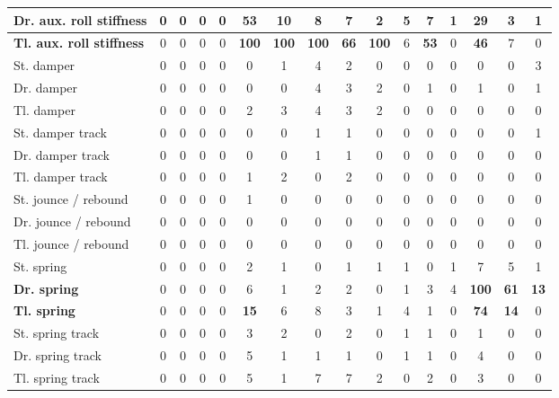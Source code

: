 \begin{table}[H]
\begin{tabular}{|l|c|c|c|c|c|c|c|c|c|c|c|c|c|c|c|}
    \hline
    \textcolor[rgb]{0.000, 0.447, 0.698}{\textbf{Dr. aux. roll stiffness}} & 0 & 0 & 0 & 0 & \textcolor[rgb]{0.000, 0.447, 0.698}{\textbf{53}} & \textbf{10} & 8 & 7 & 2 & 5 & 7 & 1 & \textcolor[rgb]{0.000, 0.620, 0.451}{\textbf{29}} & 3 & 1 \\
    \hline
    \textcolor[rgb]{0.851, 0.373, 0.008}{\textbf{Tl. aux. roll stiffness}} & 0 & 0 & 0 & 0 & \textcolor[rgb]{0.835, 0.369, 0.000}{\textbf{100}} & \textcolor[rgb]{0.835, 0.369, 0.000}{\textbf{100}} & \textcolor[rgb]{0.835, 0.369, 0.000}{\textbf{100}} & \textcolor[rgb]{0.000, 0.447, 0.698}{\textbf{66}} & \textcolor[rgb]{0.835, 0.369, 0.000}{\textbf{100}} & 6 & \textcolor[rgb]{0.000, 0.447, 0.698}{\textbf{53}} & 0 & \textcolor[rgb]{0.000, 0.620, 0.451}{\textbf{46}} & 7 & 0 \\
    \hline
    St. damper & 0 & 0 & 0 & 0 & 0 & 1 & 4 & 2 & 0 & 0 & 0 & 0 & 0 & 0 & 3 \\
    \hline
    Dr. damper & 0 & 0 & 0 & 0 & 0 & 0 & 4 & 3 & 2 & 0 & 1 & 0 & 1 & 0 & 1 \\
    \hline
    Tl. damper & 0 & 0 & 0 & 0 & 2 & 3 & 4 & 3 & 2 & 0 & 0 & 0 & 0 & 0 & 0 \\
    \hline
    St. damper track & 0 & 0 & 0 & 0 & 0 & 0 & 1 & 1 & 0 & 0 & 0 & 0 & 0 & 0 & 1 \\
    \hline
    Dr. damper track & 0 & 0 & 0 & 0 & 0 & 0 & 1 & 1 & 0 & 0 & 0 & 0 & 0 & 0 & 0 \\
    \hline
    Tl. damper track & 0 & 0 & 0 & 0 & 1 & 2 & 0 & 2 & 0 & 0 & 0 & 0 & 0 & 0 & 0 \\
    \hline
    St. jounce / rebound & 0 & 0 & 0 & 0 & 1 & 0 & 0 & 0 & 0 & 0 & 0 & 0 & 0 & 0 & 0 \\
    \hline
    Dr. jounce / rebound & 0 & 0 & 0 & 0 & 0 & 0 & 0 & 0 & 0 & 0 & 0 & 0 & 0 & 0 & 0 \\
    \hline
    Tl. jounce / rebound & 0 & 0 & 0 & 0 & 0 & 0 & 0 & 0 & 0 & 0 & 0 & 0 & 0 & 0 & 0 \\
    \hline
    St. spring & 0 & 0 & 0 & 0 & 2 & 1 & 0 & 1 & 1 & 1 & 0 & 1 & 7 & 5 & 1 \\
    \hline
    \textcolor[rgb]{0.851, 0.373, 0.008}{\textbf{Dr. spring}} & 0 & 0 & 0 & 0 & 6 & 1 & 2 & 2 & 0 & 1 & 3 & 4 & \textcolor[rgb]{0.835, 0.369, 0.000}{\textbf{100}} & \textcolor[rgb]{0.000, 0.447, 0.698}{\textbf{61}} & \textbf{13} \\
    \hline
    \textcolor[rgb]{0.000, 0.447, 0.698}{\textbf{Tl. spring}} & 0 & 0 & 0 & 0 & \textbf{15} & 6 & 8 & 3 & 1 & 4 & 1 & 0 & \textcolor[rgb]{0.000, 0.447, 0.698}{\textbf{74}} & \textbf{14} & 0 \\
    \hline
    St. spring track & 0 & 0 & 0 & 0 & 3 & 2 & 0 & 2 & 0 & 1 & 1 & 0 & 1 & 0 & 0 \\
    \hline
    Dr. spring track & 0 & 0 & 0 & 0 & 5 & 1 & 1 & 1 & 0 & 1 & 1 & 0 & 4 & 0 & 0 \\
    \hline
    Tl. spring track & 0 & 0 & 0 & 0 & 5 & 1 & 7 & 7 & 2 & 0 & 2 & 0 & 3 & 0 & 0 \\
    \hline

\end{tabular}%
\end{table}%

